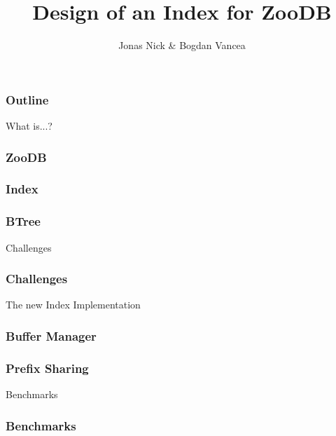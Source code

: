 \documentclass{beamer}
\title{Design of an Index for ZooDB}
\author{Jonas Nick \& Bogdan Vancea}
\begin{document}
  \frame{\titlepage}
  \begin{frame}
    \frametitle{Outline}
    \tableofcontents[hideallsubsections]
  \end{frame}

  \begin{section}{What is...?}
    \begin{frame}
      \frametitle{ZooDB}
    \end{frame}
    \begin{frame}
      \frametitle{Index}
    \end{frame}
    \begin{frame}
      \frametitle{BTree}
    \end{frame}
  \end{section}

  \begin{section}{Challenges}
    \begin{frame}
      \frametitle{Challenges}
    \end{frame}
  \end{section}

  \begin{section}{The new Index Implementation}
    \begin{frame}
      \frametitle{Buffer Manager}
    \end{frame}
    \begin{frame}
      \frametitle{Prefix Sharing}
    \end{frame}
  \end{section}

  \begin{section}{Benchmarks}
    \begin{frame}
      \frametitle{Benchmarks}
    \end{frame}
  \end{section}
\end{document}
